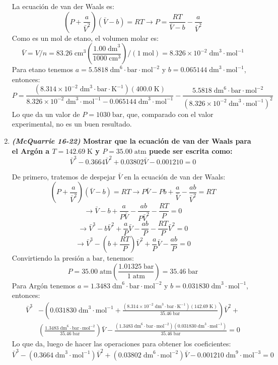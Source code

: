 \documentclass[a4paper,12pt]{article}
\begin{document}
\begin{enumerate}
La ecuaci\'on de van der Waals es:
$$\left(P+\frac{a}{\bar{V}^2}\right)\left(\bar{V}-b\right)=RT\rightarrow P=\frac{RT}{\bar{V}-b}-\frac{a}{\bar{V}^2}$$
Como es un mol de etano, el volumen molar es: 
$$\bar{V}=V/n=83.26\;\mbox{cm}^3\left(\frac{1.00\;\mbox{dm}^{3}}{1000\;\mbox{cm}^{3}}\right)/(1\;\mbox{mol})=8.326\times 10^{-2}\;\mbox{dm}^3\cdot\mbox{mol}^{-1}$$
Para etano tenemos $a=5.5818\;\mbox{dm}^6\cdot\mbox{bar}\cdot\mbox{mol}^{-2}$ y $b=0.065144\;\mbox{dm}^3\cdot\mbox{mol}^{-1}$, entonces:
$$P=\frac{(8.314\times 10^{-2}\;\mbox{dm}^3\cdot\mbox{bar}\cdot\mbox{K}^{-1})(400.0\;\mbox{K})}{8.326\times 10^{-2}\;\mbox{dm}^3\cdot\mbox{mol}^{-1}-0.065144\;\mbox{dm}^3\cdot\mbox{mol}^{-1}}-\frac{5.5818\;\mbox{dm}^6\cdot\mbox{bar}\cdot\mbox{mol}^{-2}}{\left(8.326\times 10^{-2}\;\mbox{dm}^3\cdot\mbox{mol}^{-1}\right)^2}$$
Lo que da un valor de $P=1030\;\mbox{bar}$, que, comparado con el valor experimental, no es un buen resultado.

 \item \textbf{\textit{(McQuarrie 16-22)} Mostrar que la ecuaci\'on de van der Waals para el Arg\'on a $T=142.69\;\mbox{K}$ y $P=35.00\;\mbox{atm}$ puede ser escrita como:
$$\bar{V}^3-0.3664\bar{V}^2+0.03802\bar{V}-0.001210=0$$} %

De primero, tratemos de despejar $\bar{V}$ en la ecuaci\'on de van der Waals:
$$\left(P+\frac{a}{\bar{V}^2}\right)\left(\bar{V}-b\right)=RT\rightarrow P\bar{V}-Pb+\frac{a}{\bar{V}}-\frac{ab}{\bar{V}^2}=RT$$
$$\rightarrow \bar{V}-b+\frac{a}{P\bar{V}}-\frac{ab}{P\bar{V}^2}-\frac{RT}{P}=0$$
$$\rightarrow \bar{V}^3-b\bar{V}^2+\frac{a}{P}\bar{V}-\frac{ab}{P}-\frac{RT}{P}\bar{V}^2=0$$
$$\rightarrow \bar{V}^3-\left(b+\frac{RT}{P}\right)\bar{V}^2+\frac{a}{P}\bar{V}-\frac{ab}{P}=0$$
Convirtiendo la presi\'on a $\mbox{bar}$, tenemos:
$$P=35.00\;\mbox{atm}\left(\frac{1.01325\;\mbox{bar}}{1\;\mbox{atm}}\right)=35.46\;\mbox{bar}$$
Para Arg\'on tenemos $a=1.3483\;\mbox{dm}^6\cdot\mbox{bar}\cdot\mbox{mol}^{-2}$ y $b=0.031830\;\mbox{dm}^3\cdot\mbox{mol}^{-1}$, entonces:
\begin{align*}
\bar{V}^3& -\left(0.031830\;\mbox{dm}^3\cdot\mbox{mol}^{-1}+\frac{(8.314\times 10^{-2}\;\mbox{dm}^3\cdot\mbox{bar}\cdot\mbox{K}^{-1})(142.69\;\mbox{K})}{35.46\;\mbox{bar}}\right)\bar{V}^2+ \\
& \left(\frac{1.3483\;\mbox{dm}^6\cdot\mbox{bar}\cdot\mbox{mol}^{-2}}{35.46\;\mbox{bar}}\right)\bar{V}-\frac{(1.3483\;\mbox{dm}^6\cdot\mbox{bar}\cdot\mbox{mol}^{-2})(0.031830\;\mbox{dm}^3\cdot\mbox{mol}^{-1})}{35.46\;\mbox{bar}}=0
\end{align*}
Lo que da, luego de hacer las operaciones para obtener los coeficientes:
$$\bar{V}^3-(0.3664\;\mbox{dm}^3\cdot\mbox{mol}^{-1})\bar{V}^2+(0.03802\;\mbox{dm}^6\cdot\mbox{mol}^{-2})\bar{V}-0.001210\;\mbox{dm}^9\cdot\mbox{mol}^{-3}=0$$


\end{enumerate}
\end{document}
